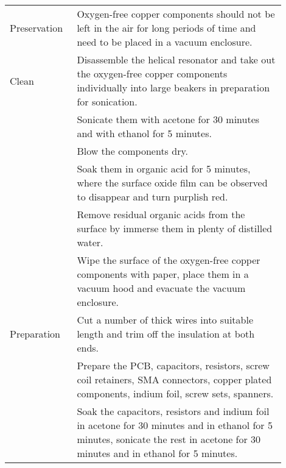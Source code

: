 \begin{table}
\begin{tabular}{p{0.2\linewidth}p{0.7\linewidth}}
        \midrule
        Preservation & Oxygen-free copper components should not be left in the air for long periods of time and need to be placed in a vacuum enclosure.                                                                                          \\
        Clean        & Disassemble the helical resonator and take out the oxygen-free copper components individually into large beakers in preparation for sonication.                                                                            \\
                     & Sonicate them with acetone for 30 minutes and with ethanol for 5 minutes.                                                                                                                                                  \\
                     & Blow the components dry.                                                                                                                                                                                                   \\
                     & Soak them in organic acid for 5 minutes, where the surface oxide film can be observed to disappear and turn purplish red.                                                                                                  \\
                     & Remove residual organic acids from the surface by immerse them in plenty of distilled water.                                                                                                                               \\
                     & Wipe the surface of the oxygen-free copper components with paper, place them in a vacuum hood and evacuate the vacuum enclosure.                                                                                           \\
        Preparation  & Cut a number of thick wires into suitable length and trim off the insulation at both ends.                                                                                                                                 \\
                     & Prepare the PCB, capacitors, resistors, screw coil retainers, SMA connectors, copper plated components, indium foil, screw sets, spanners.                                                                                 \\
                     & Soak the capacitors, resistors and indium foil in acetone for 30 minutes and in ethanol for 5 minutes, sonicate the rest in acetone for 30 minutes and in ethanol for 5 minutes.                                           \\

\end{tabular}
\end{table}
